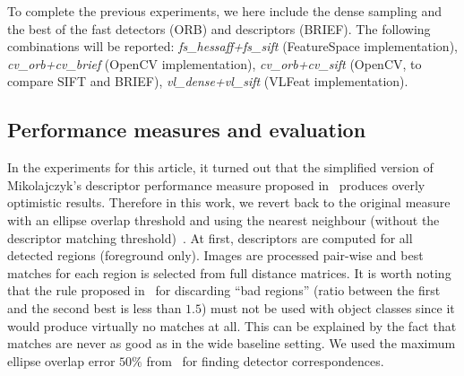 \documentclass[journal]{IEEEtran}
\begin{document}
To complete the previous experiments, we here include the
dense sampling and the best of the fast detectors (ORB) and
descriptors (BRIEF). The following combinations will be reported:
{\em fs\_hessaff+fs\_sift} (FeatureSpace implementation),
{\em cv\_orb+cv\_brief} (OpenCV implementation),
{\em cv\_orb+cv\_sift} (OpenCV, to compare SIFT and BRIEF),
{\em vl\_dense+vl\_sift} (VLFeat implementation).

%
\subsection{Performance measures and evaluation\label{sec:descrperformance}}
In the experiments for this article, 
it turned out that the simplified version of Mikolajczyk's descriptor
performance measure proposed in~\cite{LanKanKam:2012} produces overly optimistic
results. Therefore in this work, we revert back to the original measure with an
ellipse overlap threshold and using the nearest neighbour (without the descriptor
matching threshold)~\cite{MikSch:2005}.
At first, descriptors are computed for
all detected regions (foreground only). Images are processed
pair-wise and best matches for each region is selected from
full distance matrices.
It is worth noting
that the rule proposed in~\cite{Low:2004} for discarding ``bad regions''
(ratio between the first and the second best is less than $1.5$) must
not be used with object classes since it would produce virtually no matches
at all. This can be explained by the fact that matches are
never as good as in the wide baseline setting.
We used the maximum ellipse
overlap error $50\%$ from~\cite{MikSch:2005} for finding detector correspondences.
\end{document}
